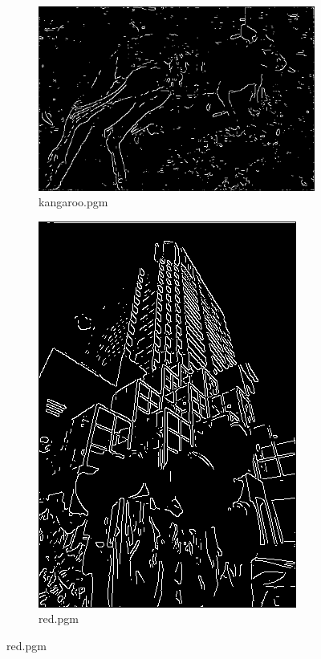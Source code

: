 \documentclass{article}
\begin{document}
\begin{figure}[!h]
  \begin{subfigure}{0.6\textwidth}
    \includegraphics[width=\textwidth]{kangnonmax}
    \caption{kangaroo.pgm}
    \label{fig:f1}
  \end{subfigure}
     \hfill
  \begin{subfigure}{0.4\textwidth}
    \includegraphics[width=\textwidth]{rednonmax}
    \caption{red.pgm}
    \label{fig:f2}
  \end{subfigure}
  \hfill
  

\end{figure}
\end{document}
